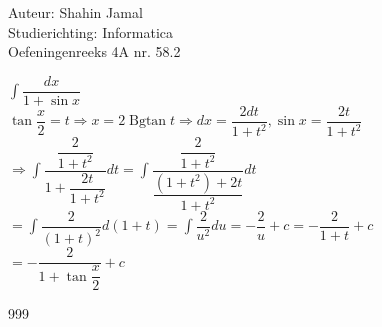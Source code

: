 \documentclass[a4paper]{article}
\begin{document}
  
\noindent \large Auteur: Shahin Jamal \\
\noindent \large Studierichting: Informatica\\
\noindent \large Oefeningenreeks 4A nr. 58.2\\

\medskip

\normalsize

$\displaystyle\int\dfrac{dx}{1+\sin x}$\\

$\tan \dfrac{x}{2} = t \Rightarrow x = 2\operatorname{Bgtan}t \Rightarrow dx = \dfrac{2dt}{1+t^2}, \sin x = \dfrac{2t}{1+t^2}$\\

$\Rightarrow \displaystyle\int \dfrac{\dfrac{2}{1+t^2}}{1+\dfrac{2t}{1+t^2}}dt = \displaystyle\int \dfrac{\dfrac{2}{1+t^2}}{\dfrac{(1+t^2)+2t}{1+t^2}}dt$\\

$= \displaystyle\int \dfrac{2}{(1+t)^2}d(1+t) = \displaystyle\int \dfrac{2}{u^2}du = -\dfrac{2}{u}+c = -\dfrac{2}{1+t}+c$\\

$= -\dfrac{2}{1+\tan\dfrac{x}{2}} + c$

\begin{thebibliography}{999}
\end{thebibliography}
\end{document}

